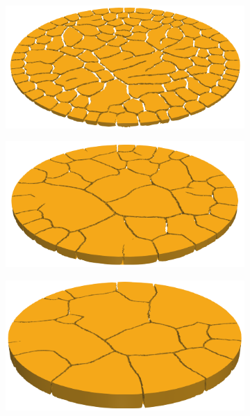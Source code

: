\begin{figure}[!htb]
    \begin{subfigure}{0.31\textwidth}
        \includegraphics[width=\textwidth,scale=0.5]{past/figures/4mm_3D.png}
    \end{subfigure}
    \begin{subfigure}{0.31\textwidth}
        \includegraphics[width=\textwidth,scale=0.5]{past/figures/8mm_3D.png}
    \end{subfigure}
    \begin{subfigure}{0.31\textwidth}
        \includegraphics[width=\textwidth,scale=0.5]{past/figures/16mm_3D.png}
    \end{subfigure}
\end{figure}
